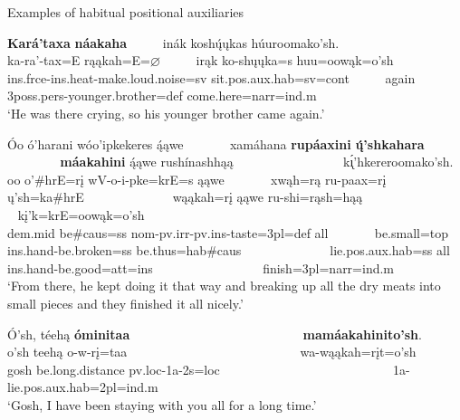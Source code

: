 \begin{exe}

    \item\label{Ch5HabitualPositionals} Examples of habitual positional auxiliaries

    \begin{xlist}
        \item\label{Ch5HabitualPositionalsA} \glll \textbf{Kará'taxa} \textbf{náakaha} ~ ~ ~ inák koshų́ųkas húuroomako'sh.\\
        ka-ra'-tax=E rąąkah=E=$\varnothing$ ~ ~ ~ irąk ko-shųųka=s huu=oowąk=o'sh\\
        ins.frce-ins.heat-\textnormal{make.loud.noise}=sv \textnormal{sit}.pos.aux.hab=sv=cont ~ ~ ~ \textnormal{again} 3poss.pers-\textnormal{younger.brother}=def \textnormal{come.here}=narr=ind.m\\
        \glt `He was there crying, so his younger brother came again.' \citep[221]{hollow1973b}

        \item\label{Ch5HabitualPositionalsB} \glll Óo ó'harani  wóo'ipkekeres ą́ąwe ~ ~ ~ ~ xamáhana \textbf{rupáaxini} \textbf{ų́'shkahara} ~ ~ ~ ~ ~ ~ ~ ~ \textbf{máakahini} ą́ąwe rushínashhąą ~ ~ ~ ~ ~ ~ ~ ~ ~ ~ k\'{ı̨}'hkereroomako'sh.\\
        oo o'\#hrE=rį wV-o-i-pke=krE=s ąąwe ~ ~ ~ ~ xwąh=rą ru-paax=rį ų'sh=ka\#hrE ~ ~ ~ ~ ~ ~ ~ ~ wąąkah=rį ąąwe ru-shi=rąsh=hąą ~ ~ ~ ~ ~ ~ ~ ~ ~ ~ kį'k=krE=oowąk=o'sh\\
        dem.mid \textnormal{be}\#caus=ss nom-pv.irr-pv.ins-\textnormal{taste}=3pl=def \textnormal{all} ~ ~ ~ ~ \textnormal{be.small}=top ins.hand-\textnormal{be.broken}=ss \textnormal{be.thus}=hab\#caus ~ ~ ~ ~ ~ ~ ~ ~ \textnormal{lie}.pos.aux.hab=ss \textnormal{all} ins.hand-\textnormal{be.good}=att=ins ~ ~ ~ ~ ~ ~ ~ ~ ~ ~ \textnormal{finish}=3pl=narr=ind.m\\
        \glt `From there, he kept doing it that way and breaking up all the dry meats into small pieces and they finished it all nicely.' \citep[224]{hollow1973b} 

        \item\label{Ch5HabitualPositionalsC} \glll Ó'sh, téehą \textbf{óminitaa} ~ ~ ~ ~ ~ ~ ~ ~ ~ ~ ~ ~ ~ ~ ~ ~ \textbf{mamáakahinito'sh}.\\
        o'sh teehą o-w-rį=taa ~ ~ ~ ~ ~ ~ ~ ~ ~ ~ ~ ~ ~ ~ ~ ~ wa-wąąkah=rįt=o'sh\\
        \textnormal{gosh} \textnormal{be.long.distance} pv.loc-1a-2s=loc ~ ~ ~ ~ ~ ~ ~ ~ ~ ~ ~ ~ ~ ~ ~ ~ 1a-\textnormal{lie}.pos.aux.hab=2pl=ind.m\\
        \glt `Gosh, I have been staying with you all for a long time.' \citep[31]{hollow1973a}
    \end{xlist}
\end{exe}


